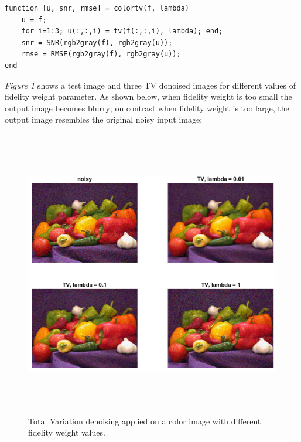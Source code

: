 \documentclass[a4paper,11pt]{article}
\begin{document}
\begin{lstlisting}[caption={Total Variation + RMSE/SNR on color images in Matlab},captionpos=b,style=Matlab-editor]
function [u, snr, rmse] = colortv(f, lambda)
    u = f;
    for i=1:3; u(:,:,i) = tv(f(:,:,i), lambda); end;
    snr = SNR(rgb2gray(f), rgb2gray(u));
    rmse = RMSE(rgb2gray(f), rgb2gray(u));
end
\end{lstlisting}

\newpage

\emph{Figure 1} shows a test image and three TV donoised images for different values of fidelity weight parameter. As shown below, when fidelity weight is too small the output image becomes blurry; on contrast when fidelity weight is too large, the output image resembles the original noisy input image:

\begin{figure}[!htb]
  \centering
  \includegraphics[width=16cm, height=12.6cm]{1.png}
  \caption{\small Total Variation denoising applied on a color image with different fidelity weight values.}
\end{figure}
\end{document}
